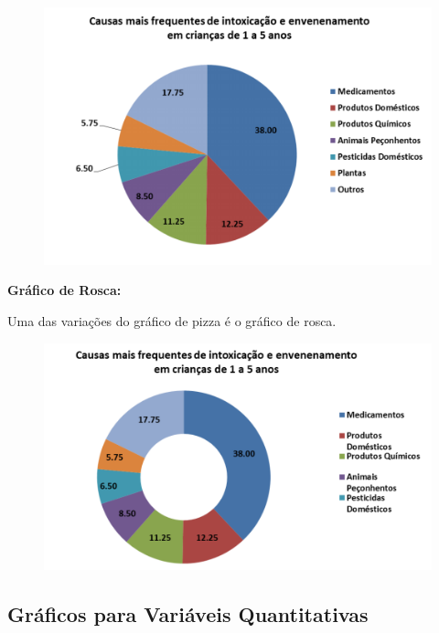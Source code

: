 \documentclass[
	12pt,				%
	oneside,			%
	a4paper,			%
	english,			%
	french,				%
	spanish,			%
	brazil,				%
	]{abntex2}
\begin{document}
\begin{figure}[H]
\begin{center}

\includegraphics[scale=0.75]{grafico3.jpg}  

\end{center}
\end{figure}

\textbf{Gráfico de Rosca:}

Uma das variações do gráfico de pizza é o gráfico de rosca.

\begin{figure}[H]
\begin{center}

\includegraphics[scale=0.75]{grafico4.jpg}  

\end{center}
\end{figure}

\subsection{Gráficos para Variáveis Quantitativas}
\end{document}
